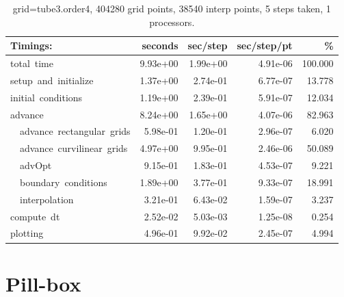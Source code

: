 \documentclass[11pt]{article}
\begin{document}
\begin{table}[hbt]
\begin{center}\footnotesize
\begin{tabular}{|l|r|r|r|r|} \hline
  Timings:   &  seconds &    sec/step  &  sec/step/pt &  \%    \\ \hline
total~time\dotfill &   9.93e+00 &   1.99e+00 &   4.91e-06 & 100.000 \\ 
setup~and~initialize\dotfill &   1.37e+00 &   2.74e-01 &   6.77e-07 &  13.778 \\ 
initial~conditions\dotfill &   1.19e+00 &   2.39e-01 &   5.91e-07 &  12.034 \\ 
advance\dotfill &   8.24e+00 &   1.65e+00 &   4.07e-06 &  82.963 \\ 
~~advance~rectangular~grids\dotfill &   5.98e-01 &   1.20e-01 &   2.96e-07 &   6.020 \\ 
~~advance~curvilinear~grids\dotfill &   4.97e+00 &   9.95e-01 &   2.46e-06 &  50.089 \\ 
~~advOpt~~~~\dotfill &   9.15e-01 &   1.83e-01 &   4.53e-07 &   9.221 \\ 
~~boundary~conditions\dotfill &   1.89e+00 &   3.77e-01 &   9.33e-07 &  18.991 \\ 
~~interpolation\dotfill &   3.21e-01 &   6.43e-02 &   1.59e-07 &   3.237 \\ 
compute~dt\dotfill &   2.52e-02 &   5.03e-03 &   1.25e-08 &   0.254 \\ 
plotting\dotfill &   4.96e-01 &   9.92e-02 &   2.45e-07 &   4.994 \\ 
 \hline 
\end{tabular}
\end{center}
\caption{grid=tube3.order4, 404280 grid points, 38540 interp points, 5 steps taken, 1 processors.}
\label{tab:tube3.order4}
\end{table}


\clearpage
\section{Pill-box}
\end{document}

